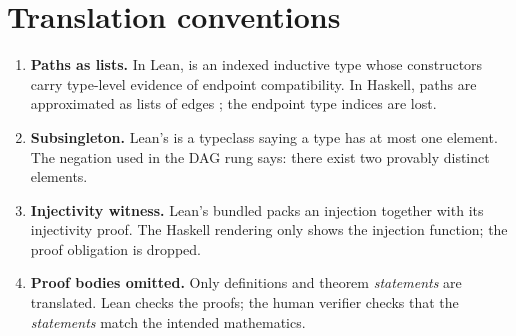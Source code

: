 \documentclass[11pt,a4paper]{article}
\begin{document}
\section{Translation conventions}

\begin{enumerate}
\item \textbf{Paths as lists.}  In Lean,  is an indexed
  inductive type whose constructors carry type-level evidence of endpoint
  compatibility.  In Haskell, paths are approximated as lists of edges
  \hask{[Edge]}; the endpoint type indices are lost.

\item \textbf{Subsingleton.}  Lean's  is a typeclass
  saying a type has at most one element.  The negation used in the DAG rung
  says: there exist two provably distinct elements.

\item \textbf{Injectivity witness.}  Lean's bundled  packs an
  injection together with its injectivity proof.  The Haskell rendering only
  shows the injection function; the proof obligation is dropped.

\item \textbf{Proof bodies omitted.}  Only definitions and theorem
  \emph{statements} are translated.  Lean checks the proofs; the human
  verifier checks that the \emph{statements} match the intended mathematics.
\end{enumerate}
\end{document}
